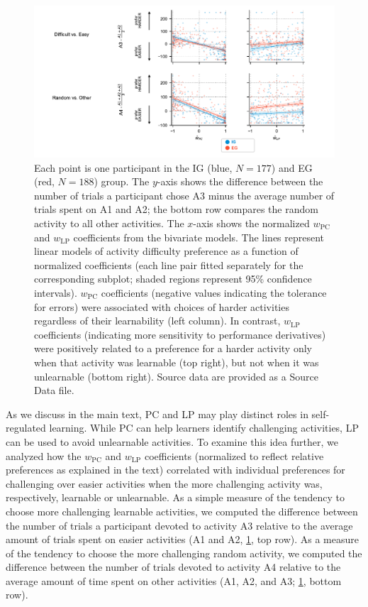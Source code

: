 \begin{subappendices}
\begin{figure}[th]
    \includegraphics[width=1.1\textwidth]{Figures/c4/fig_s7.pdf}
    \caption[short Appendix figure description]{Each point is one participant in the \ac{IG} (blue, $N=177$) and \ac{EG} (red, $N=188$) group. The $y$-axis shows the difference between the number of trials a participant chose A3 minus the average number of trials spent on A1 and A2; the bottom row compares the random activity to all other activities. The $x$-axis shows the normalized $w_{\mathrm{PC}}$ and $w_{\mathrm{LP}}$ coefficients from the bivariate models. The lines represent linear models of activity difficulty preference as a function of normalized coefficients (each line pair fitted separately for the corresponding subplot; shaded regions represent 95\% confidence intervals). $w_{\mathrm{PC}}$ coefficients (negative values indicating the tolerance for errors) were associated with choices of harder activities regardless of their learnability (left column). In contrast, $w_{\mathrm{LP}}$ coefficients (indicating more sensitivity to performance derivatives) were positively related to a preference for a harder activity only when that activity was learnable (top right), but not when it was unlearnable (bottom right). Source data are provided as a Source Data file.}
    \label{fig:CH4A_7_model_coefficients}
\end{figure}

As we discuss in the main text, \ac{PC} and \ac{LP} may play distinct roles in self-regulated learning. While \ac{PC} can help learners identify challenging activities, \ac{LP} can be used to avoid unlearnable activities. To examine this idea further, we analyzed how the $w_\mathrm{PC}$ and $w_\mathrm{LP}$ coefficients (normalized to reflect relative preferences as explained in the text) correlated with individual preferences for challenging over easier activities when the more challenging activity was, respectively, learnable or unlearnable. As a simple measure of the tendency to choose more challenging learnable activities, we computed the difference between the number of trials a participant devoted to activity A3 relative to the average amount of trials spent on easier activities (A1 and A2, \cref{fig:CH4A_7_model_coefficients}, top row). As a measure of the tendency to choose the more challenging random activity, we computed the difference between the number of trials devoted to activity A4 relative to the average amount of time spent on other activities (A1, A2, and A3; \cref{fig:CH4A_7_model_coefficients}, bottom row). 
        

\end{subappendices}
